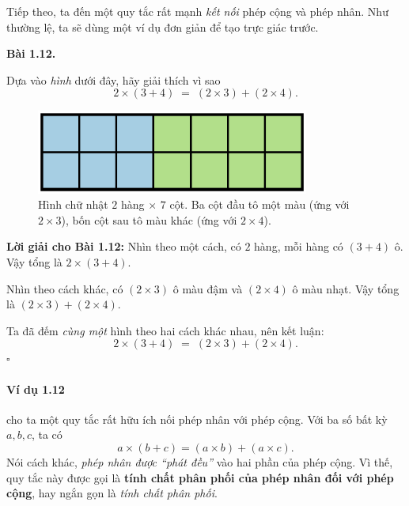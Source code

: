 \documentclass[14pt,a4paper]{extbook}
\newenvironment{problem}[1][]{
  \par\noindent\textbf{Bài #1.}\ \ignorespaces
}{\par}
\begin{document}

Tiếp theo, ta đến một quy tắc rất mạnh \emph{kết nối} phép cộng và phép nhân.
Như thường lệ, ta sẽ dùng một ví dụ đơn giản để tạo trực giác trước.

\begin{problem}[1.12]
Dựa vào \emph{hình} dưới đây, hãy giải thích vì sao
\[
2\times(3+4) \;=\; (2\times3) + (2\times4).
\]

\begin{figure}[ht!]
  \centering
  \includegraphics[width=0.80\textwidth]{img/fig-prob1.12.pdf}
  \caption*{\small Hình chữ nhật \(2\) hàng \(\times\) \(7\) cột.
  Ba cột đầu tô một màu (ứng với \(2\times3\)),
  bốn cột sau tô màu khác (ứng với \(2\times4\)).}
\end{figure}
\end{problem}

\noindent\textbf{Lời giải cho Bài 1.12:}
Nhìn theo một cách, có \(2\) hàng, mỗi hàng có \((3+4)\) ô.
Vậy tổng là \(2\times(3+4)\).

Nhìn theo cách khác, có \((2\times3)\) ô màu đậm và \((2\times4)\) ô màu nhạt.
Vậy tổng là \((2\times3) + (2\times4)\).

Ta đã đếm \emph{cùng một} hình theo hai cách khác nhau, nên kết luận:
\[
2\times(3+4) \;=\; (2\times3) + (2\times4).
\]
\(\square\)


\paragraph{Ví dụ 1.12} cho ta một quy tắc rất hữu ích nối phép nhân với
phép cộng. Với ba số bất kỳ \(a,b,c\), ta có
\[
a\times(b+c)=(a\times b)+(a\times c).
\]
Nói cách khác, \emph{phép nhân được “phát đều”} vào hai phần của phép
cộng. Vì thế, quy tắc này được gọi là \textbf{tính chất phân phối của
phép nhân đối với phép cộng}, hay ngắn gọn là \emph{tính chất phân phối}.
\end{document}
